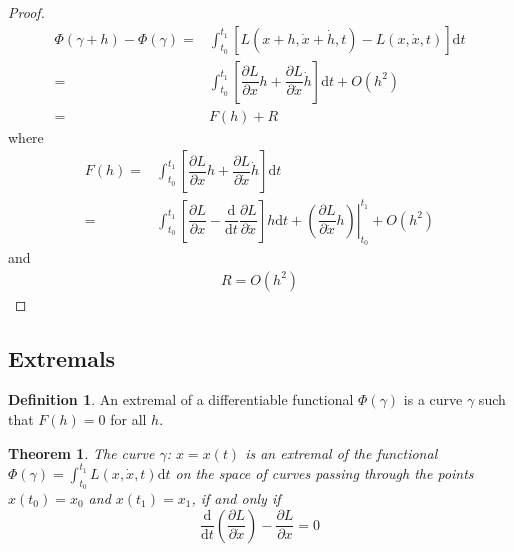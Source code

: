 \documentclass[conference]{IEEEtran}
\newtheorem{theorem}{Theorem}[section]
\theoremstyle{definition}
\newtheorem{definition}{Definition}[section]
\theoremstyle{remark}
\begin{document}
    \begin{proof}
        \begin{align*}
            \Phi(\gamma + h) - \Phi(\gamma) =& \int_{t_0}^{t_1} \left[ L(x+h, \dot{x} + \dot{h}, t) - L(x, \dot{x}, t) \right] \mathrm{d} t \\
            =& \int_{t_0}^{t_1} \left[ \dfrac{\partial L}{\partial x} h + \dfrac{\partial L}{\partial \dot{x}} \dot{h} \right] \mathrm{d} t + O(h^2) \\
            =& F(h) + R
        \end{align*}
        where
        \begin{align*}
            F(h) =& \int_{t_0}^{t_1} \left[ \dfrac{\partial L}{\partial x} h + \dfrac{\partial L}{\partial \dot{x}} \dot{h} \right] \mathrm{d} t \\
            =& \int_{t_0}^{t_1} \left[ \dfrac{\partial L}{\partial x} - \dfrac{\mathrm{d}}{\mathrm{d} t} \dfrac{\partial L}{\partial \dot{x}} \right] h \mathrm{d} t + \left. \left( \dfrac{\partial L}{\partial \dot{x}} h \right) \right|_{t_0}^{t_1} + O(h^2)
        \end{align*}
        and
        \begin{align*}
            R = O(h^2)
        \end{align*}
    \end{proof}

    \subsection{Extremals}
    \begin{definition}
        An extremal of a differentiable functional $\Phi(\gamma)$ is a curve $\gamma$ such that $F(h) = 0$ for all $h$.
    \end{definition}

    \begin{theorem}
        The curve $\gamma$: $x = x(t)$ is an extremal of the functional $\Phi(\gamma) = \int_{t_0}^{t_1} L(x, \dot{x}, t) \mathrm{d} t$ on the space of curves passing through the points $x(t_0) = x_0$ and $x(t_1) = x_1$, if and only if
        \begin{equation*}
            \dfrac{\mathrm{d}}{\mathrm{d} t} \left( \dfrac{\partial L}{\partial \dot{x}} \right) - \dfrac{\partial L}{\partial x} = 0
        \end{equation*}
    \end{theorem}
\end{document}
